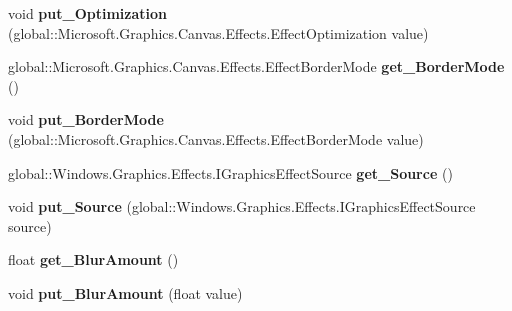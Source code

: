 \begin{DoxyCompactItemize}
void {\bfseries put\+\_\+\+Optimization} (global\+::\+Microsoft.\+Graphics.\+Canvas.\+Effects.\+Effect\+Optimization value)
\item 
\mbox{\label{interface_microsoft_1_1_graphics_1_1_canvas_1_1_effects_1_1_i_gaussian_blur_effect_a9070edd9d76886803e481852cc79fe7a}} 
global\+::\+Microsoft.\+Graphics.\+Canvas.\+Effects.\+Effect\+Border\+Mode {\bfseries get\+\_\+\+Border\+Mode} ()
\item 
\mbox{\label{interface_microsoft_1_1_graphics_1_1_canvas_1_1_effects_1_1_i_gaussian_blur_effect_a206e8f9a37a96c96af289283beac798d}} 
void {\bfseries put\+\_\+\+Border\+Mode} (global\+::\+Microsoft.\+Graphics.\+Canvas.\+Effects.\+Effect\+Border\+Mode value)
\item 
\mbox{\label{interface_microsoft_1_1_graphics_1_1_canvas_1_1_effects_1_1_i_gaussian_blur_effect_a843c2c9b086f2e10542ae9aa2b39a3f6}} 
global\+::\+Windows.\+Graphics.\+Effects.\+I\+Graphics\+Effect\+Source {\bfseries get\+\_\+\+Source} ()
\item 
\mbox{\label{interface_microsoft_1_1_graphics_1_1_canvas_1_1_effects_1_1_i_gaussian_blur_effect_a366b87bbdd12c4d7eeb1c50ae1c56d3d}} 
void {\bfseries put\+\_\+\+Source} (global\+::\+Windows.\+Graphics.\+Effects.\+I\+Graphics\+Effect\+Source source)
\item 
\mbox{\label{interface_microsoft_1_1_graphics_1_1_canvas_1_1_effects_1_1_i_gaussian_blur_effect_a88a386d562a3ed84bdcebfeffa5d35c0}} 
float {\bfseries get\+\_\+\+Blur\+Amount} ()
\item 
\mbox{\label{interface_microsoft_1_1_graphics_1_1_canvas_1_1_effects_1_1_i_gaussian_blur_effect_a977d2c3c0ddaac5ffbbedae24b0a0770}} 
void {\bfseries put\+\_\+\+Blur\+Amount} (float value)
\item 
\mbox{\label{interface_microsoft_1_1_graphics_1_1_canvas_1_1_effects_1_1_i_gaussian_blur_effect_a2d4f490b0296608bf9c8cd9d42125733}} 

\end{DoxyCompactItemize}
